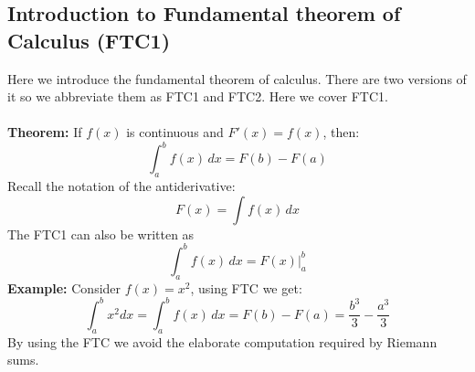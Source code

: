 \documentclass{report}
\begin{document}
\subsection{Introduction to Fundamental theorem of Calculus (FTC1)} %
Here we introduce the fundamental theorem of calculus.
There are two versions of it so we abbreviate them as
FTC1 and FTC2. Here we cover FTC1.\\
\vspace{1mm}\\
\textbf{Theorem:} If $f(x)$ is continuous and $F'(x)=f(x)$, then:
\begin{equation*}
\int_a^bf(x)\,dx=F(b)-F(a)
\end{equation*}
Recall the notation of the antiderivative:
\begin{equation*}
F(x)=\int f(x)\,dx
\end{equation*}
The FTC1 can also be written as
\begin{equation*}
\int_a^bf(x)\,dx=F(x)|_a^b
\end{equation*}
\textbf{Example:} Consider $f(x)=x^2$, using FTC we get:
\begin{equation*}
\int_a^bx^2dx=\int_a^bf(x)\,dx=F(b)-F(a)=
\frac{b^3}{3}-\frac{a^3}{3}
\end{equation*}
By using the FTC we avoid the elaborate computation required by Riemann sums.
\newpage
\end{document}
